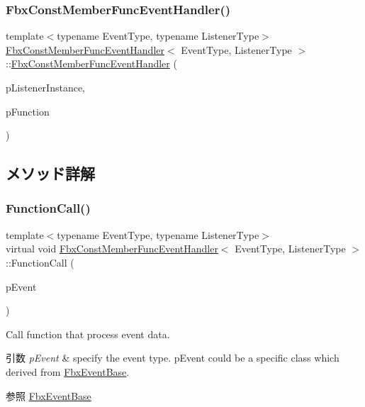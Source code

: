 \subsubsection{\texorpdfstring{Fbx\+Const\+Member\+Func\+Event\+Handler()}{FbxConstMemberFuncEventHandler()}}
{\footnotesize\ttfamily template$<$typename Event\+Type, typename Listener\+Type$>$ \\
\hyperlink{class_fbx_const_member_func_event_handler}{Fbx\+Const\+Member\+Func\+Event\+Handler}$<$ Event\+Type, Listener\+Type $>$\+::\hyperlink{class_fbx_const_member_func_event_handler}{Fbx\+Const\+Member\+Func\+Event\+Handler} (\begin{DoxyParamCaption}\item[{Listener\+Type $\ast$}]{p\+Listener\+Instance,  }\item[{Callback\+Fnc}]{p\+Function }\end{DoxyParamCaption})}



\subsection{メソッド詳解}
\mbox{\label{class_fbx_const_member_func_event_handler_ae6c6805404e8045de40289893709dc54}} 
\subsubsection{\texorpdfstring{Function\+Call()}{FunctionCall()}}
{\footnotesize\ttfamily template$<$typename Event\+Type, typename Listener\+Type$>$ \\
virtual void \hyperlink{class_fbx_const_member_func_event_handler}{Fbx\+Const\+Member\+Func\+Event\+Handler}$<$ Event\+Type, Listener\+Type $>$\+::Function\+Call (\begin{DoxyParamCaption}\item[{const \hyperlink{class_fbx_event_base}{Fbx\+Event\+Base} \&}]{p\+Event }\end{DoxyParamCaption})\hspace{0.3cm}{\ttfamily [virtual]}}

Call function that process event data. 
\begin{DoxyParams}{引数}
{\em p\+Event} & specify the event type. p\+Event could be a specific class which derived from \hyperlink{class_fbx_event_base}{Fbx\+Event\+Base}. \\
\hline
\end{DoxyParams}
\begin{DoxySeeAlso}{参照}
\hyperlink{class_fbx_event_base}{Fbx\+Event\+Base} 
\end{DoxySeeAlso}


